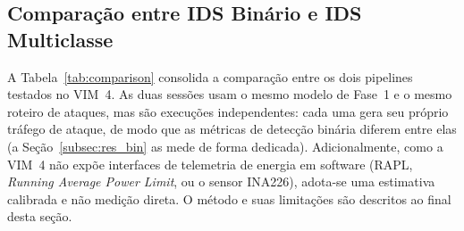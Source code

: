 \documentclass[12pt]{article}
\begin{document}
\subsection{Comparação entre IDS Binário e IDS Multiclasse}
\label{subsec:res_comp}
A Tabela~\ref{tab:comparison} consolida a comparação entre os dois pipelines
testados no VIM~4. As duas sessões usam o mesmo modelo de Fase~1 e o mesmo roteiro de ataques, mas são execuções independentes: cada uma gera seu próprio tráfego de ataque, de modo que as métricas de detecção binária diferem entre elas (a Seção~\ref{subsec:res_bin} as mede de forma dedicada). Adicionalmente, como a VIM~4 não expõe interfaces de telemetria de energia em software (RAPL, \textit{Running Average Power Limit}, ou o sensor INA226), adota-se uma estimativa calibrada e não medição direta. O método e suas limitações são descritos ao final desta seção.
\end{document}
